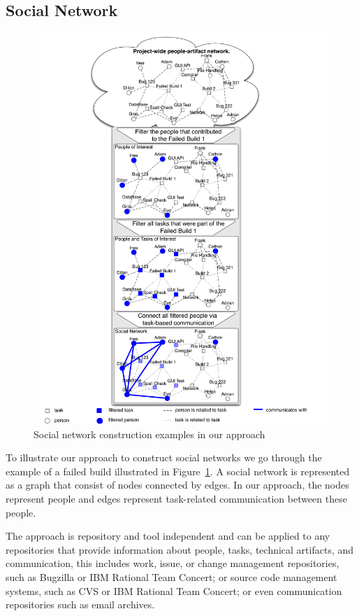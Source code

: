 \subsection{Social Network}
\begin{figure}[t!]
\begin{center}
\includegraphics[height=1.3\textwidth]{./figures/grand_figure}
\caption{Social network construction examples in our approach}
\label{fig:network}
\end{center}
\end{figure}
To illustrate our approach to construct social networks we go through the example of a failed build illustrated in Figure~\ref{fig:network}. 
A social network is represented as a graph that consist of nodes connected by edges. 
In our approach, the nodes represent people and edges represent task-related communication between these people.

The approach is repository and tool independent and can be applied to any repositories that provide information about people, tasks, technical artifacts, and communication, this includes work, issue, or change management repositories, such as Bugzilla or IBM Rational Team Concert; or source code management systems, such as CVS or IBM Rational Team Concert; or even communication repositories such as email archives.


